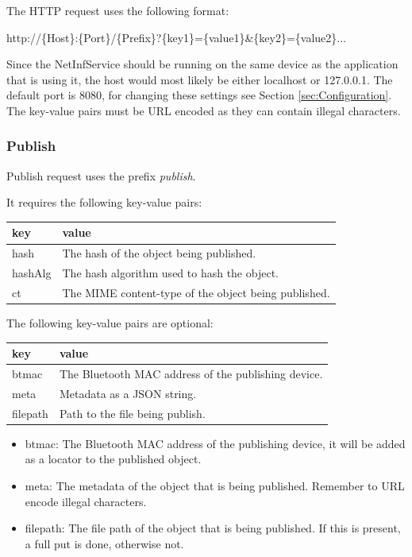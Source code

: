 The HTTP request uses the following format:

\begin{center}
http://\{Host\}:\{Port\}/\{Prefix\}?\{key1\}=\{value1\}\&\{key2\}=\{value2\}...
\end{center}

Since the NetInfService should be running on the same device as the application that is using it, the host would most likely be either localhost or 127.0.0.1. The default port is 8080, for changing these settings see Section \ref{sec:Configuration}. The key-value pairs must be URL encoded as they can contain illegal characters.

\subsubsection{Publish}

Publish request uses the prefix \emph{publish}.

It requires the following key-value pairs:

\begin{tabular}{ | l | l | }
	\hline
	key & value  \\ \hline \hline
	hash & The hash of the object being published.  \\ \hline
	hashAlg & The hash algorithm used to hash the object. \\ \hline
	ct & The MIME content-type of the object being published. \\ \hline
\end{tabular}

The following key-value pairs are optional:

\begin{tabular}{ | l | l | }
	\hline
	key & value  \\ \hline \hline
	btmac & The Bluetooth MAC address of the publishing device. \\ \hline
	meta & Metadata as a JSON string. \\ \hline
	filepath & Path to the file being publish. \\ \hline
\end{tabular}

\begin{itemize}
	\item btmac: The Bluetooth MAC address of the publishing device, it will be added as a locator to the published object.
	\item meta: The metadata of the object that is being published. Remember to URL encode illegal characters.
	\item filepath: The file path of the object that is being published. If this is present, a full put is done, otherwise not.
 \end{itemize}

